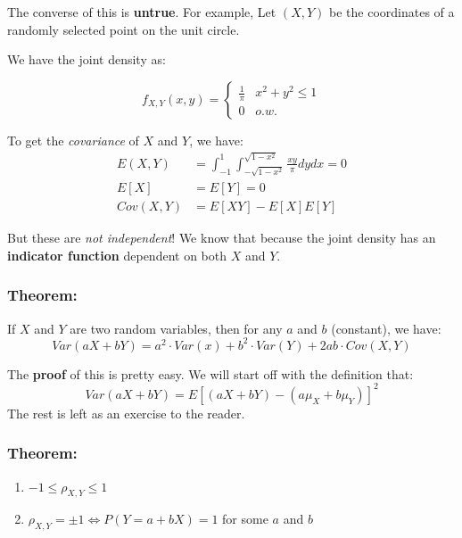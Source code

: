 \documentclass{article}
\begin{document}
The converse of this is \textbf{untrue}. For example, Let $(X,Y)$ be the coordinates of a randomly selected point on the unit circle.

We have the joint density as:

\begin{equation*}
    f_{X,Y}(x,y) = \begin{cases}
                        \frac{1}{\pi} & x^2 + y^2 \leq 1\\
                        0 & o.w.
                    \end{cases}
\end{equation*}

To get the \textit{covariance} of $X$ and $Y$, we have:
\begin{equation*}
    \begin{split}
        E(X,Y) &= \int_{-1}^1 \int_{-\sqrt{1-x^2}}^{\sqrt{1-x^2}} \frac{xy}{\pi} dy dx = 0\\
        E[X] &= E[Y] = 0\\
        Cov(X,Y) &= E[XY] - E[X]E[Y]
    \end{split}
\end{equation*}

But these are \textit{not independent}! We know that because the joint density has an \textbf{indicator function} dependent on both $X$ and $Y$.


\subsubsection*{Theorem:}
    If $X$ and $Y$ are two random variables, then for any $a$ and $b$ (constant), we have:
    \begin{equation*}
        Var(aX + bY) = a^2\cdot Var(x) + b^2\cdot Var(Y) + 2ab\cdot Cov(X,Y)
    \end{equation*}

The \textbf{proof} of this is pretty easy. We will start off with the definition that:
\begin{equation*}
    Var(aX + bY) = E\left[(aX+bY)-(a\mu_X + b\mu_Y) \right]^2
\end{equation*}
The rest is left as an exercise to the reader.

\subsubsection*{Theorem:}
\begin{enumerate}
    \item $-1 \leq \rho_{X,Y} \leq 1$
    \item $\rho_{X,Y} = \pm 1 \iff P(Y=a+bX) = 1$ for some $a$ and $b$
\end{enumerate}
\end{document}
